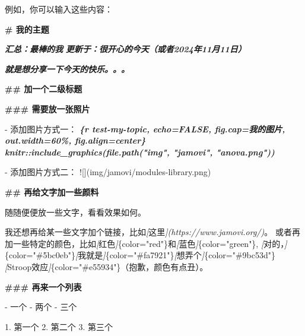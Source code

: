 \documentclass[]{ctexbook}
\newenvironment{Shaded}{\begin{snugshade}}{\end{snugshade}}
\newcommand{\AlertTok}[1]{\textcolor[rgb]{0.94,0.16,0.16}{#1}}
\newcommand{\CommentTok}[1]{\textcolor[rgb]{0.56,0.35,0.01}{\textit{#1}}}
\newcommand{\FunctionTok}[1]{\textcolor[rgb]{0.13,0.29,0.53}{\textbf{#1}}}
\newcommand{\InformationTok}[1]{\textcolor[rgb]{0.56,0.35,0.01}{\textbf{\textit{#1}}}}
\newcommand{\NormalTok}[1]{#1}
\newcommand{\OtherTok}[1]{\textcolor[rgb]{0.56,0.35,0.01}{#1}}
\newcommand{\SpecialStringTok}[1]{\textcolor[rgb]{0.31,0.60,0.02}{#1}}
\theoremstyle{definition}
\theoremstyle{definition}
\theoremstyle{definition}
\theoremstyle{definition}
\theoremstyle{remark}
\begin{document}
例如，你可以输入这些内容：

\begin{Shaded}
\begin{Highlighting}[]
\FunctionTok{\# 我的主题}

\InformationTok{    汇总：最棒的我     }
\InformationTok{    更新于：很开心的今天（或者2024年11月11日）}

\InformationTok{    就是想分享一下今天的快乐。。。}

\FunctionTok{\#\# 加一个二级标题}


\FunctionTok{\#\#\# 需要放一张照片}

\SpecialStringTok{{-} }\NormalTok{添加图片方式一：}
\InformationTok{\textasciigrave{}\textasciigrave{}\textasciigrave{}\{r test{-}my{-}topic, echo=FALSE, fig.cap=\textquotesingle{}我的图片\textquotesingle{}, out.width=\textquotesingle{}60\%\textquotesingle{}, fig.align=\textquotesingle{}center\textquotesingle{}\}}
\InformationTok{knitr::include\_graphics(file.path("img", "jamovi", "anova.png"))}
\InformationTok{\textasciigrave{}\textasciigrave{}\textasciigrave{}}

\SpecialStringTok{{-} }\NormalTok{添加图片方式二：}
\AlertTok{![](img/jamovi/modules{-}library.png)}

\FunctionTok{\#\# 再给文字加一些颜料}

\NormalTok{随随便便放一些文字，看看效果如何。}

\NormalTok{我还想再给某一些文字加个链接，比如}\CommentTok{[}\OtherTok{这里}\CommentTok{](https://www.jamovi.org/)}\NormalTok{。}
\NormalTok{或者再加一些特定的颜色，比如}\CommentTok{[}\OtherTok{红色}\CommentTok{]}\NormalTok{\{color="red"\}和}\CommentTok{[}\OtherTok{蓝色}\CommentTok{]}\NormalTok{\{color="green"\},}
\CommentTok{[}\OtherTok{对的，}\CommentTok{]}\NormalTok{\{color="\#5bc0eb"\}}\CommentTok{[}\OtherTok{我就是}\CommentTok{]}\NormalTok{\{color="\#fa7921"\}}\CommentTok{[}\OtherTok{想弄个}\CommentTok{]}\NormalTok{\{color="\#9bc53d"\}}
\CommentTok{[}\OtherTok{Stroop效应}\CommentTok{]}\NormalTok{\{color="\#e55934"\}（抱歉，颜色有点丑）。}

\FunctionTok{\#\#\# 再来一个列表}

\SpecialStringTok{{-} }\NormalTok{一个}
\SpecialStringTok{{-} }\NormalTok{两个}
\SpecialStringTok{{-} }\NormalTok{三个}

\SpecialStringTok{1. }\NormalTok{第一个}
\SpecialStringTok{2. }\NormalTok{第二个}
\SpecialStringTok{3. }\NormalTok{第三个}
\end{Highlighting}
\end{Shaded}
\end{document}
